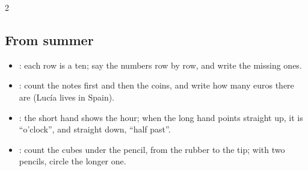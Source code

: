 {\begin{multicols}{2}
\subsection*{From summer}
\begin{itemize}[leftmargin=5mm, itemsep=1pt, topsep=0pt]
\item \textbf{\lblTabla}: each row is a ten; say the numbers row by row,
  and write the missing ones.
\item \textbf{\lblDinero}: count the notes first and then the coins,
  and write how many euros there are (Lucía lives in Spain).
\item \textbf{\lblHora}: the short hand shows the hour; when the long
  hand points straight up, it is “o'clock”, and straight down, “half
  past”.
\item \textbf{\lblMide}: count the cubes under the pencil, from the
  rubber to the tip; with two pencils, circle the longer one.
\end{itemize}
\end{multicols}}
\newpage
